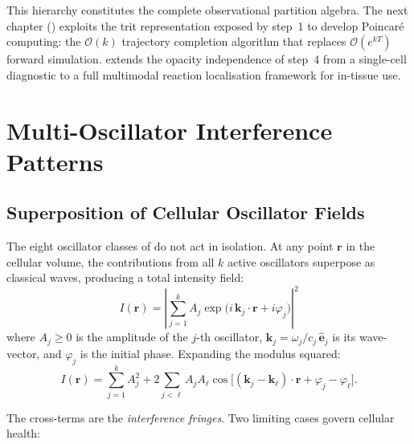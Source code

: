 This hierarchy constitutes the complete observational partition algebra.  The
next chapter () exploits the trit representation exposed
by step~1 to develop Poincaré computing: the $\mathcal{O}(k)$ trajectory
completion algorithm that replaces $\mathcal{O}(e^{kT})$ forward simulation.
 extends the opacity independence of step~4 from a
single-cell diagnostic to a full multimodal reaction localisation framework
for in-tissue use.

\section{Multi-Oscillator Interference Patterns}
\label{sec:ch04-multi-oscillator-interference}

\subsection{Superposition of Cellular Oscillator Fields}

The eight oscillator classes of  do not act in
isolation.  At any point $\mathbf{r}$ in the cellular volume, the
contributions from all $k$ active oscillators superpose as classical waves,
producing a total intensity field:
\begin{equation}
\label{eq:ch04-interference-sum}
    I(\mathbf{r}) = \left|\sum_{j=1}^{k} A_j
        \exp\!\bigl(i\,\mathbf{k}_j \cdot \mathbf{r} + i\varphi_j\bigr)
    \right|^2
\end{equation}
where $A_j \geq 0$ is the amplitude of the $j$-th oscillator,
$\mathbf{k}_j = \omega_j/c_j\,\hat{\mathbf{e}}_j$ is its wave-vector, and
$\varphi_j$ is the initial phase.  Expanding the modulus squared:
\begin{equation}
\label{eq:ch04-interference-expanded}
    I(\mathbf{r}) = \sum_{j=1}^{k} A_j^2
        + 2\sum_{j < \ell} A_j A_\ell
          \cos\!\bigl[(\mathbf{k}_j - \mathbf{k}_\ell)\cdot\mathbf{r}
                      + \varphi_j - \varphi_\ell\bigr].
\end{equation}

The cross-terms are the \emph{interference fringes}.  Two limiting cases
govern cellular health:

